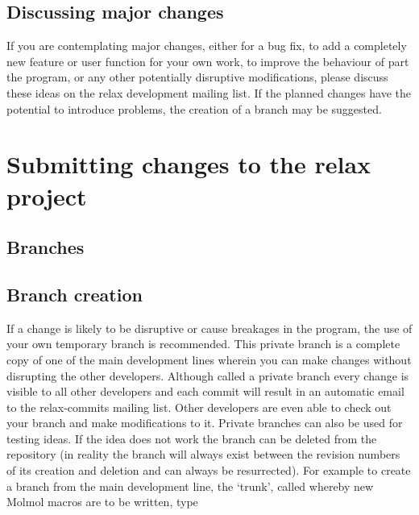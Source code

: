 \subsection{Discussing major changes}

If you are contemplating major changes, either for a bug fix, to add a completely new feature or user function for your own work, to improve the behaviour of part the program, or any other potentially disruptive modifications, please discuss these ideas on the relax development mailing list.
If the planned changes have the potential to introduce problems, the creation of a branch may be suggested.




\section{Submitting changes to the relax project}


\subsection{Branches}


\subsection{Branch creation}

If a change is likely to be disruptive or cause breakages in the program, the use of your own temporary branch is recommended.
This private branch is a complete copy of one of the main development lines wherein you can make changes without disrupting the other developers.
Although called a private branch every change is visible to all other developers and each commit will result in an automatic email to the relax-commits mailing list.
Other developers are even able to check out your branch and make modifications to it.
Private branches can also be used for testing ideas.
If the idea does not work the branch can be deleted from the repository (in reality the branch will always exist between the revision numbers of its creation and deletion and can always be resurrected).
For example to create a branch from the main development line, the `trunk', called  whereby new Molmol macros are to be written, type

